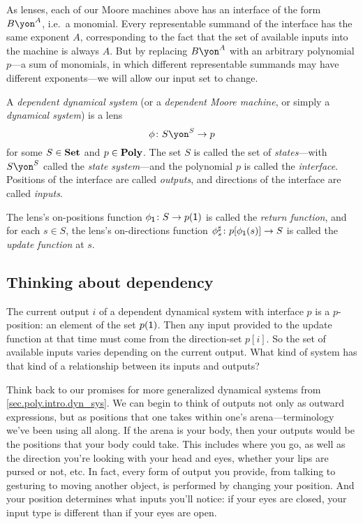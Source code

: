 \documentclass[Book-Poly]{subfiles}
\begin{document}
As lenses, each of our Moore machines above has an interface of the form $B\yon^A$, i.e.\ a monomial.
Every representable summand of the interface has the same exponent $A$, corresponding to the fact that the set of available inputs into the machine is always $A$.
But by replacing $B\yon^A$ with an arbitrary polynomial $p$---a sum of monomials, in which different representable summands may have different exponents---we will allow our input set to change.

\begin{definition}\label{def.gen_moore}
A \emph{dependent dynamical system} (or a \emph{dependent Moore machine}, or simply a \emph{dynamical system}) is a lens
\[\phi\colon S\yon^S\to p\]
for some $S\in\mathbf{Set}$ and $p\in\mathbf{Poly}$. The set $S$ is called the set of \emph{states}---with $S\yon^S$ called the \emph{state system}---and the polynomial $p$ is called the \emph{interface}.
Positions of the interface are called \emph{outputs}, and directions of the interface are called \emph{inputs}.

The lens's on-positions function $\phi_{\textsf{1}}\colon S\to p(\textsf{1})$ is called the \emph{return function}, and for each $s\in S$, the lens's on-directions function $\phi^\sharp_s\colon p[\phi_{\textsf{1}}(s)]\to S$ is called the \emph{update function} at $s$.
\end{definition}

\subsection{Thinking about dependency}

The current output $i$ of a dependent dynamical system with interface $p$ is a $p$-position: an element of the set $p(\textsf{1})$.
Then any input provided to the update function at that time must come from the direction-set $p[i]$.
So the set of available inputs varies depending on the current output.
What kind of system has that kind of a relationship between its inputs and outputs?

Think back to our promises for more generalized dynamical systems from \cref{sec.poly.intro.dyn_sys}.
We can begin to think of outputs not only as outward expressions, but as positions that one takes within one's arena---terminology we've been using all along.
If the arena is your body, then your outputs would be the positions that your body could take.
This includes where you go, as well as the direction you're looking with your head and eyes, whether your lips are pursed or not, etc.
In fact, every form of output you provide, from talking to gesturing to moving another object, is performed by changing your position. And your position determines what inputs you'll notice: if your eyes are closed, your input type is different than if your eyes are open.
\end{document}
